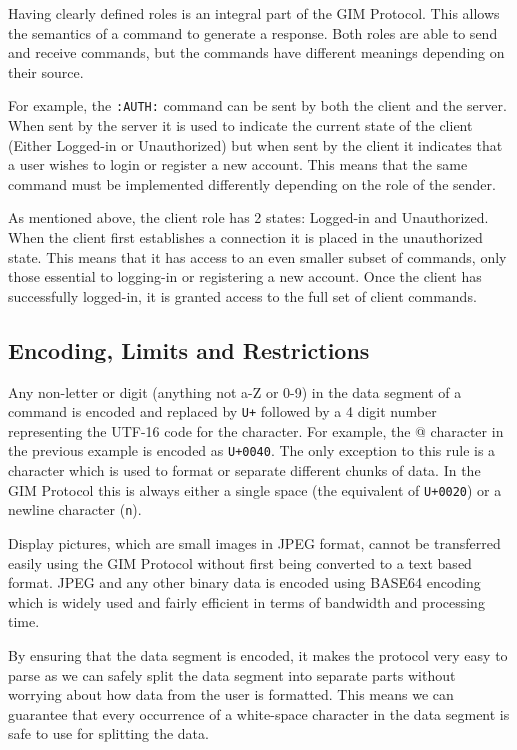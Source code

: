 Having clearly defined roles is an integral part of the GIM Protocol. This allows the semantics of a command to generate a response. Both roles are able to send and receive commands, but the commands have different meanings depending on their source. 

For example, the \texttt{:AUTH:} command can be sent by both the client and the server. When sent by the server it is used to indicate the current state of the client (Either Logged-in or Unauthorized) but when sent by the client it indicates that a user wishes to login or register a new account. This means that the same command must be implemented differently depending on the role of the sender.

As mentioned above, the client role has 2 states: Logged-in and Unauthorized. When the client first establishes a connection it is placed in the unauthorized state. This means that it has access to an even smaller subset of commands, only those essential to logging-in or registering a new account. Once the client has successfully logged-in, it is granted access to the full set of client commands.


\subsection{Encoding, Limits and Restrictions}
\label{encoding}

Any non-letter or digit (anything not a-Z or 0-9) in the data segment of a command is encoded and replaced by \texttt{\SLASH U+} followed by a 4 digit number representing the UTF-16 code for the character. For example, the @ character in the previous example is encoded as \texttt{\SLASH U+0040}. The only exception to this rule is a character which is used to format or separate different chunks of data. In the GIM Protocol this is always either a single space (the equivalent of \texttt{\SLASH U+0020}) or a newline character (\texttt{\SLASH n}).

Display pictures, which are small images in JPEG format, cannot be transferred easily using the GIM Protocol without first being converted to a text based format. JPEG and any other binary data is encoded using BASE64 encoding which is widely used and fairly efficient in terms of bandwidth and processing time.

By ensuring that the data segment is encoded, it makes the protocol very easy to parse as we can safely split the data segment into separate parts without worrying about how data from the user is formatted. This means we can guarantee that every occurrence of a white-space character in the data segment is safe to use for splitting the data.

